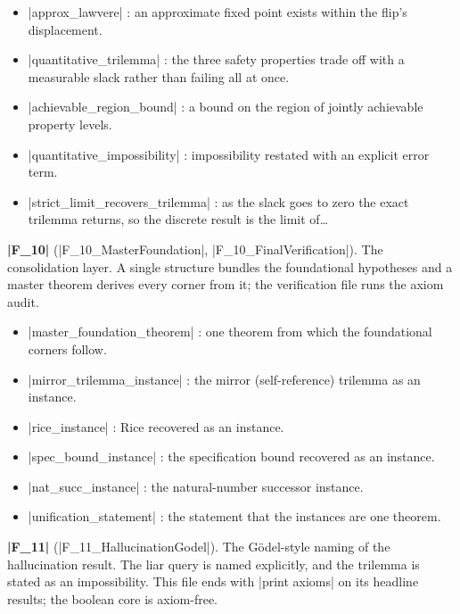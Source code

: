 \documentclass{memoir}
\begin{document}
\begin{itemize}
\item \LeanVerb|approx_lawvere| : an approximate fixed point exists within the flip's
   displacement.
\item \LeanVerb|quantitative_trilemma| : the three safety properties trade off with a measurable
   slack rather than failing all at once.
\item \LeanVerb|achievable_region_bound| : a bound on the region of jointly achievable property
   levels.
\item \LeanVerb|quantitative_impossibility| : impossibility restated with an explicit error
   term.
\item \LeanVerb|strict_limit_recovers_trilemma| : as the slack goes to zero the exact trilemma
   returns, so the discrete result is the limit of…

\end{itemize}


\textbf{\LeanVerb|F_10|} (\LeanVerb|F_10_MasterFoundation|, \LeanVerb|F_10_FinalVerification|). The consolidation
layer. A single structure bundles the foundational hypotheses and a master theorem
derives every corner from it; the verification file runs the axiom audit.

\begin{itemize}
\item \LeanVerb|master_foundation_theorem| : one theorem from which the foundational corners
   follow.
\item \LeanVerb|mirror_trilemma_instance| : the mirror (self-reference) trilemma as an instance.
\item \LeanVerb|rice_instance| : Rice recovered as an instance.
\item \LeanVerb|spec_bound_instance| : the specification bound recovered as an instance.
\item \LeanVerb|nat_succ_instance| : the natural-number successor instance.
\item \LeanVerb|unification_statement| : the statement that the instances are one theorem.

\end{itemize}


\textbf{\LeanVerb|F_11|} (\LeanVerb|F_11_HallucinationGodel|). The Gödel-style naming of the hallucination
result. The liar query is named explicitly, and the trilemma is stated as an
impossibility. This file ends with \LeanVerb|print axioms| on its headline results; the
boolean core is axiom-free.
\end{document}
